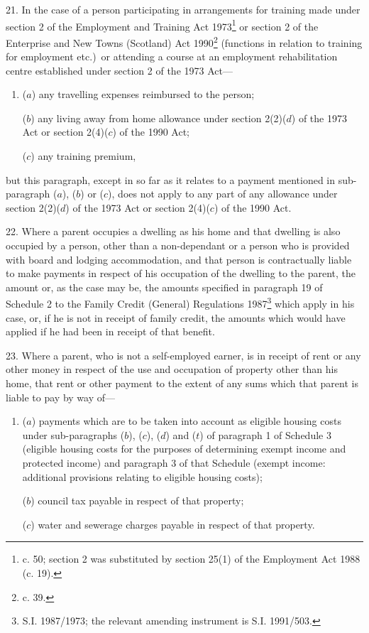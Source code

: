 \documentclass[12pt,a4paper]{article}
\begin{document}
\medskip

21.  In the case of a person participating in arrangements for training made under section 2 of the Employment and Training Act 1973\footnote{ c. 50; section 2 was substituted by section 25(1) of the Employment Act 1988 (c. 19).} or section 2 of the Enterprise and New Towns (Scotland) Act 1990\footnote{ c. 39.} (functions in relation to training for employment etc.)\ or attending a course at an employment rehabilitation centre established under section 2 of the 1973 Act—
\begin{enumerate}\item[]
($a$) any travelling expenses reimbursed to the person;

($b$) any living away from home allowance under section 2(2)($d$) of the 1973 Act or section 2(4)($c$) of the 1990 Act;

($c$) any training premium,
\end{enumerate}
but this paragraph, except in so far as it relates to a payment mentioned in sub-paragraph ($a$), ($b$) or ($c$), does not apply to any part of any allowance under section 2(2)($d$) of the 1973 Act or section 2(4)($c$) of the 1990 Act.

\medskip

22.  Where a parent occupies a dwelling as his home and that dwelling is also occupied by a person, other than a non-dependant or a person who is provided with board and lodging accommodation, and that person is contractually liable to make payments in respect of his occupation of the dwelling to the parent, the amount or, as the case may be, the amounts specified in paragraph 19 of Schedule 2 to the Family Credit (General) Regulations 1987\footnote{\frenchspacing S.I. 1987/1973; the relevant amending instrument is S.I. 1991/503.} which apply in his case, or, if he is not in receipt of family credit, the amounts which would have applied if he had been in receipt of that benefit.

\medskip

23.  Where a parent, who is not a self-employed earner, is in receipt of rent or any other money in respect of the use and occupation of property other than his home, that rent or other payment to the extent of any sums which that parent is liable to pay by way of—
\begin{enumerate}\item[]
($a$) payments which are to be taken into account as eligible housing costs under sub-paragraphs ($b$), ($c$), ($d$) and ($t$) of paragraph 1 of Schedule 3 (eligible housing costs for the purposes of determining exempt income and protected income) and paragraph 3 of that Schedule (exempt income: additional provisions relating to eligible housing costs);

($b$) council tax payable in respect of that property;

($c$) water and sewerage charges payable in respect of that property.
\end{enumerate}
\end{document}
